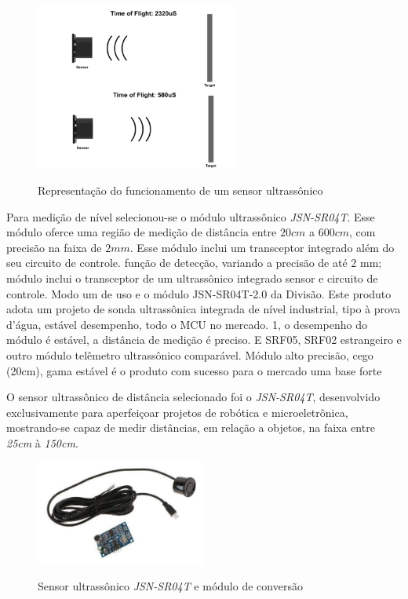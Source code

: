 \begin{figure}[H]
	\centering
	\caption{Representação do funcionamento de um sensor ultrassônico}
	\includegraphics[width=0.6\textwidth]{figuras/ultrassonico_operacao.png}
	\label{fig:operacao_ultrassonico}
\end{figure}

Para medição de nível selecionou-se o módulo ultrassônico \textit{JSN-SR04T}. Esse módulo oferce uma região de medição de distância entre $20 cm$ a $600 cm$, com precisão na faixa de $2 mm$.
Esse módulo inclui um transceptor integrado além do seu circuito de controle.
função de detecção, variando a precisão de até 2 mm; módulo inclui o transceptor de um ultrassônico integrado
sensor e circuito de controle. Modo um de uso e o módulo JSN-SR04T-2.0 da Divisão.
Este produto adota um projeto de sonda ultrassônica integrada de nível industrial, tipo à prova d'água, estável
desempenho, todo o MCU no mercado. 1, o desempenho do módulo é estável, a distância de medição
é preciso. E SRF05, SRF02 estrangeiro e outro módulo telêmetro ultrassônico comparável. Módulo alto
precisão, cego (20cm), gama estável é o produto com sucesso para o mercado uma base forte


O sensor ultrassônico de distância selecionado foi o \textit{JSN-SR04T}, desenvolvido exclusivamente para aperfeiçoar projetos de robótica e microeletrônica, mostrando-se capaz de medir distâncias, em relação a objetos, na faixa entre \textit{25cm} à \textit{150cm}.

\begin{figure}[H]
	\centering
	\caption{Sensor ultrassônico \textit{JSN-SR04T} e módulo de conversão}
	\includegraphics[width=0.5\textwidth]{figuras/sensor_ultra.jpg}
	\label{fig:sensor_ultra}
\end{figure}

